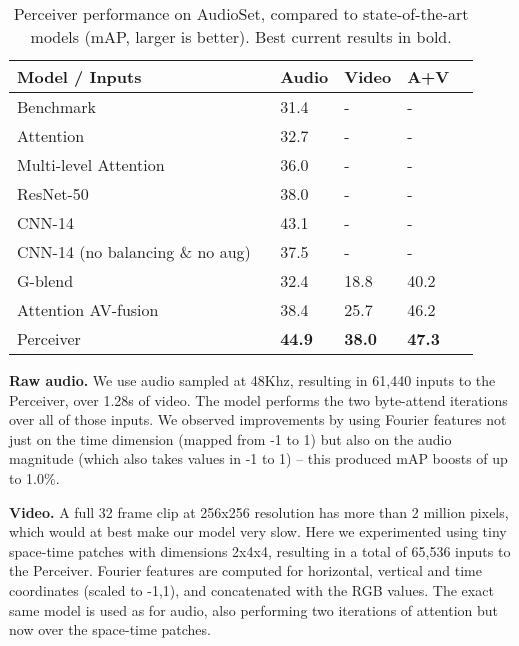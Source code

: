 \documentclass{article}
\begin{document}
\begin{table*}[]
\centering
\begin{tabular}{|l|l|l|l|l|}
\hline
Model / Inputs                                      & Audio        & Video         & A+V            \\ \hline
Benchmark~\cite{gemmeke2017audio}                   & 31.4         &  -            &  -             \\ 
Attention~\cite{kong2018audio}                      & 32.7         & -             & -              \\ 
Multi-level Attention ~\cite{yu2018multi}           & 36.0         & -             & -              \\ 
ResNet-50~\cite{ford2019deep}                       & 38.0         &  -            &  -             \\ 
CNN-14~\cite{kong2020panns}                         & 43.1         &  -            &  -             \\
CNN-14 (no balancing \& no aug) ~\cite{kong2020panns} & 37.5       &  -            &  -             \\ \hline
G-blend~\cite{wang2020makes}                        & 32.4         & 18.8          & 40.2           \\
Attention AV-fusion~\cite{fayek2020large}           & 38.4         & 25.7          & 46.2           \\ \hline
Perceiver                                           & \textbf{44.9} & \textbf{38.0} & \textbf{47.3} \\ \hline
\end{tabular}
\caption{Perceiver performance on AudioSet, compared to state-of-the-art models (mAP, larger is better). Best current results in bold.}
\label{tbl:audioset}
\vspace{-8pt}
\end{table*}

\noindent \textbf{Raw audio.} We use audio sampled at 48Khz, resulting in 61,440 inputs to the Perceiver, over 1.28s of video. The model performs the two byte-attend iterations over all of those inputs. We observed improvements by using Fourier features not just on the time dimension (mapped from -1 to 1) but also on the audio magnitude (which also takes values in -1 to 1)  -- this produced mAP boosts of up to 1.0\%. 

\noindent \textbf{Video.} A full 32 frame clip at 256x256 resolution has more than 2 million pixels, which would at best make our model very slow. Here we experimented using tiny space-time patches with dimensions 2x4x4, resulting in a total of 65,536 inputs to the Perceiver. Fourier features are computed for horizontal, vertical and time coordinates (scaled to -1,1), and concatenated with the RGB values. The exact same model is used as for audio, also performing two iterations of attention but now over the space-time patches.
\end{document}
